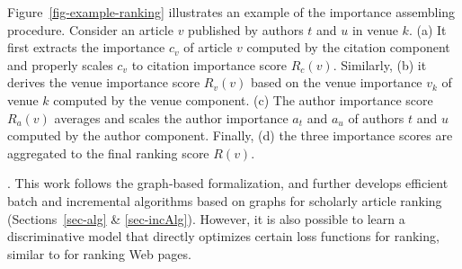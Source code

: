 \begin{example} \label{eg-ranking}
Figure~\ref{fig-example-ranking} illustrates an example of the importance assembling procedure.
Consider an article $v$ published by authors $t$ and $u$ in venue $k$.
(a) It first extracts the importance $c_v$ of article $v$ computed by the  citation component and properly scales $c_v$ to citation importance score $R_c(v)$.
Similarly, (b) it derives the venue importance score $R_v(v)$ based on the venue importance $v_k$ of venue $k$ computed  by the venue component.
(c) The author importance score $R_a(v)$ averages and scales the author importance $a_t$ and $a_u$ of authors $t$ and $u$ computed  by the author component.
Finally, (d) the three importance scores are aggregated to the final ranking score $R(v)$. 
\end{example}


. This work follows the graph-based formalization, and further develops efficient batch and incremental algorithms based on graphs for scholarly article ranking (Sections~\ref{sec-alg} \& \ref{sec-incAlg}). However, it is also possible to learn a discriminative model that directly optimizes certain loss functions for ranking, similar to \cite{Richardson06:BPR} for ranking Web pages.
